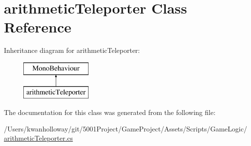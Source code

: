 \hypertarget{classarithmetic_teleporter}{}\section{arithmetic\+Teleporter Class Reference}
\label{classarithmetic_teleporter}
Inheritance diagram for arithmetic\+Teleporter\+:\begin{figure}[H]
\begin{center}
\leavevmode
\includegraphics[height=2.000000cm]{classarithmetic_teleporter}
\end{center}
\end{figure}


The documentation for this class was generated from the following file\+:\begin{DoxyCompactItemize}
\item 
/\+Users/kwanholloway/git/5001\+Project/\+Game\+Project/\+Assets/\+Scripts/\+Game\+Logic/\hyperlink{arithmetic_teleporter_8cs}{arithmetic\+Teleporter.\+cs}\end{DoxyCompactItemize}
